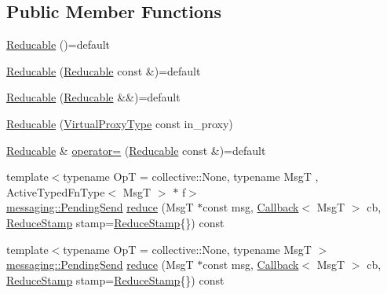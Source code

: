 \subsection*{Public Member Functions}
\begin{DoxyCompactItemize}
\item 
\hyperlink{structvt_1_1vrt_1_1collection_1_1_reducable_a807b462380873448bfcf4661b4b28a2d}{Reducable} ()=default
\item 
\hyperlink{structvt_1_1vrt_1_1collection_1_1_reducable_aafc682961c7c961547d91358cda46792}{Reducable} (\hyperlink{structvt_1_1vrt_1_1collection_1_1_reducable}{Reducable} const \&)=default
\item 
\hyperlink{structvt_1_1vrt_1_1collection_1_1_reducable_a4c5250ba5364ae0965c119773e87f4e8}{Reducable} (\hyperlink{structvt_1_1vrt_1_1collection_1_1_reducable}{Reducable} \&\&)=default
\item 
\hyperlink{structvt_1_1vrt_1_1collection_1_1_reducable_a658b587cdafda69c95ad0a2efe7a73fe}{Reducable} (\hyperlink{namespacevt_a1b417dd5d684f045bb58a0ede70045ac}{Virtual\+Proxy\+Type} const in\+\_\+proxy)
\item 
\hyperlink{structvt_1_1vrt_1_1collection_1_1_reducable}{Reducable} \& \hyperlink{structvt_1_1vrt_1_1collection_1_1_reducable_a7df8661d0e353935f034c4c0174c0872}{operator=} (\hyperlink{structvt_1_1vrt_1_1collection_1_1_reducable}{Reducable} const \&)=default
\item 
{\footnotesize template$<$typename OpT  = collective\+::\+None, typename MsgT , Active\+Typed\+Fn\+Type$<$ Msg\+T $>$ $\ast$ f$>$ }\\\hyperlink{structvt_1_1messaging_1_1_pending_send}{messaging\+::\+Pending\+Send} \hyperlink{structvt_1_1vrt_1_1collection_1_1_reducable_a6498376c8ae3532a626bc78005a0b3e3}{reduce} (MsgT $\ast$const msg, \hyperlink{namespacevt_a36db99df4c973d48b1118a293fff533f}{Callback}$<$ MsgT $>$ cb, \hyperlink{structvt_1_1vrt_1_1collection_1_1_reducable_a19f80baf23f36dad4948ef07322fd0cb}{Reduce\+Stamp} stamp=\hyperlink{structvt_1_1vrt_1_1collection_1_1_reducable_a19f80baf23f36dad4948ef07322fd0cb}{Reduce\+Stamp}\{\}) const
\item 
{\footnotesize template$<$typename OpT  = collective\+::\+None, typename MsgT $>$ }\\\hyperlink{structvt_1_1messaging_1_1_pending_send}{messaging\+::\+Pending\+Send} \hyperlink{structvt_1_1vrt_1_1collection_1_1_reducable_a07fa6b35352b3c6ae05a210248601020}{reduce} (MsgT $\ast$const msg, \hyperlink{namespacevt_a36db99df4c973d48b1118a293fff533f}{Callback}$<$ MsgT $>$ cb, \hyperlink{structvt_1_1vrt_1_1collection_1_1_reducable_a19f80baf23f36dad4948ef07322fd0cb}{Reduce\+Stamp} stamp=\hyperlink{structvt_1_1vrt_1_1collection_1_1_reducable_a19f80baf23f36dad4948ef07322fd0cb}{Reduce\+Stamp}\{\}) const

\end{DoxyCompactItemize}
